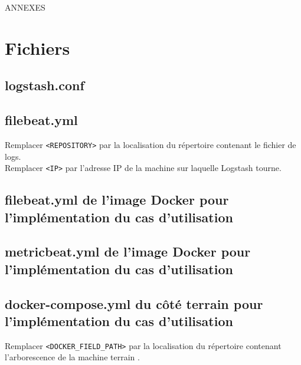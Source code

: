 \documentclass[paper=a4, fontsize=11pt]{scrartcl}
\begin{document}
\newpage

\thispagestyle{empty}
\centering
\vspace{10cm}
{\huge ANNEXES}

\newpage

\appendix
\justify

\listoftables
\newpage

\listoffigures
\newpage

\printbibliography

\newpage

\section{Fichiers}

\subsection{logstash.conf}
\label{appendix:logstashConf}


\subsection{filebeat.yml}
\label{appendix:filebeatConf}

Remplacer \verb,<REPOSITORY>, par la localisation du répertoire contenant le fichier de logs.\\
Remplacer \verb,<IP>, par l'adresse IP de la machine sur laquelle Logstash tourne.

\subsection{filebeat.yml de l'image Docker pour l'implémentation du cas d'utilisation}
\label{appendix:filebeatConfDockerUC}


\subsection{metricbeat.yml de l'image Docker pour l'implémentation du cas d'utilisation}
\label{appendix:metricbeatConfDockerUC}


\subsection{docker-compose.yml du côté terrain pour l'implémentation du cas d'utilisation}
\label{appendix:dockercomposeFieldUC}

Remplacer \verb,<DOCKER_FIELD_PATH>, par la localisation du répertoire contenant l'arborescence de la machine \og terrain \fg.\\
\end{document}
